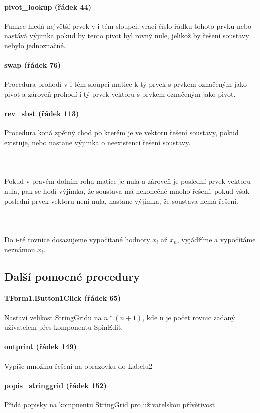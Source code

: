 \documentclass[10pt]{report}
\begin{document}
\paragraph{pivot\_lookup (\v{r}\'adek 44)} Funkce hled\'a nejv\v{e}t\v{s}\'i prvek v i-t\'em sloupci,
 vrac\'i \v{c}\'islo \v{r}\'adku tohoto prvku nebo nast\'av\'a v\'yjimka pokud by tento pivot byl rovn\'y
  nule, jeliko\v{z} by \v{r}e\v{s}en\'i soustavy nebylo jednozna\v{c}n\'e.
\paragraph{swap (\v{r}\'adek 76)} Procedura prohod\'i v i-t\'em sloupci matice k-t\'y prvek s prvkem
 ozna\v{c}en\'ym jako pivot a z\'arove\v{n} prohod\'i i-t\'y prvek vektoru s prvkem ozna\v{c}en\'ym
  jako pivot.
\paragraph{rev\_sbst (\v{r}\'adek 113)} Procedura kon\'a zp\v{e}tn\'y chod po kter\'em je ve vektoru
 \v{r}e\v{s}en\'i soustavy, pokud existuje, nebo nastane v\'yjimka o neexistenci \v{r}e\v{s}en\'i
  soustavy.
\paragraph{~}Pokud v prav\'em doln\'im rohu matice je nula a z\'arove\v{n} je posledn\'i prvek vektoru
 nula, pak se hod\'i v\'yjimka, \v{z}e soustava m\'a nekone\v{c}n\v{e} mnoho \v{r}e\v{s}en\'i, pokud v\v{s}ak posledn\'i prvek vektoru nen\'i nula, nastane v\'yjimka, \v{z}e
   soustava nem\'a \v{r}e\v{s}en\'i.
\paragraph{~}Do i-t\'e rovnice dosazujeme vypo\v{c}\'itan\'e hodnoty $x_i$ a\v{z} $x_n$, vyj\'ad\v{r}\'ime a vypo\v{c}\'it\'ame nezn\'amou $x_i$.
\subsection{Dal\v{s}\'i pomocn\'e procedury}
\paragraph{TForm1.Button1Click (\v{r}\'adek 65)} Nastav\'i velikost StringGridu na $n*(n+1)$, kde n je po\v{c}et rovnic zadan\'y u\v{z}ivatelem p\v{r}es komponentu SpinEdit.
\paragraph{outprint (\v{r}\'adek 149)} Vyp\'i\v{s}e mno\v{z}inu \v{r}e\v{s}en\'i na obrazovku do Labelu2
\paragraph{popis\_stringgrid (\v{r}\'adek 152)} P\v{r}id\'a popisky na kompnentu StringGrid pro u\v{z}ivatelskou p\v{r}\'iv\v{e}tivost
\end{document}
